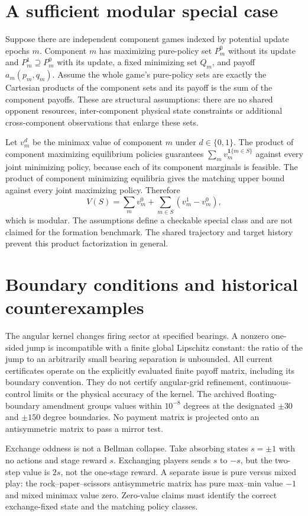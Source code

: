 \section{A sufficient modular special case}
Suppose there are independent component games indexed by potential update
epochs $m$. Component $m$ has maximizing pure-policy set $P_m^0$ without its
update and $P_m^1\supseteq P_m^0$ with its update, a fixed minimizing set $Q_m$,
and payoff $a_m(p_m,q_m)$. Assume the whole game's pure-policy sets are exactly
the Cartesian products of the component sets and its payoff is the sum of
the component payoffs. These are structural assumptions: there are no shared
opponent resources, inter-component physical state constraints or additional
cross-component observations that enlarge these sets.

Let $v_m^d$ be the minimax value of component $m$ under $d\in\{0,1\}$. The
product of component maximizing equilibrium policies guarantees
$\sum_m v_m^{\mathbf1\{m\in S\}}$ against every joint minimizing policy,
because each of its component marginals is feasible. The product of component
minimizing equilibria gives the matching upper bound against every joint
maximizing policy. Therefore
\[
 V(S)=\sum_m v_m^0+\sum_{m\in S}(v_m^1-v_m^0),
\]
which is modular. The assumptions define a checkable special class and are
not claimed for the formation benchmark. The shared trajectory and target
history prevent this product factorization in general.

\section{Boundary conditions and historical counterexamples}
The angular kernel changes firing sector at specified bearings. A nonzero
one-sided jump is incompatible with a finite global Lipschitz constant:
the ratio of the jump to an arbitrarily small bearing separation is unbounded.
All current certificates operate on the explicitly evaluated finite payoff
matrix, including its boundary convention. They do not certify angular-grid
refinement, continuous-control limits or the physical accuracy of the kernel.
The archived floating-boundary amendment groups values within $10^{-8}$
degrees at the designated $\pm30$ and $\pm150$ degree boundaries. No payment
matrix is projected onto an antisymmetric matrix to pass a mirror test.

Exchange oddness is not a Bellman collapse. Take absorbing states $s=\pm1$
with no actions and stage reward $s$. Exchanging players sends $s$ to $-s$,
but the two-step value is $2s$, not the one-stage reward. A separate issue is
pure versus mixed play: the rock--paper--scissors antisymmetric matrix has
pure max--min value $-1$ and mixed minimax value zero. Zero-value claims must
identify the correct exchange-fixed state and the matching policy classes.

